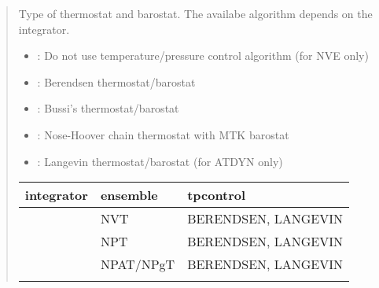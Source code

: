 \documentclass[a4paper,11pt,oneside,english]{sphinxmanual}
\begin{document}
 
\begin{quote}


Type of thermostat and barostat. The availabe algorithm depends on the integrator.
\begin{itemize}
\item {} 
: Do not use temperature/pressure control algorithm (for NVE only)

\item {} 
: Berendsen thermostat/barostat 

\item {} 
: Bussi’s thermostat/barostat  

\item {} 
: Nose-Hoover chain thermostat with MTK barostat  

\item {} 
: Langevin thermostat/barostat  (for ATDYN only)

\end{itemize}


\begin{savenotes}\sphinxattablestart
\centering
\begin{tabulary}{\linewidth}[t]{|T|T|T|}
\hline
\sphinxstyletheadfamily 
integrator
&\sphinxstyletheadfamily 
ensemble
&\sphinxstyletheadfamily 
tpcontrol
\\
\hline{}%
&
NVT
&
BERENDSEN, LANGEVIN
\\
&
NPT
&
BERENDSEN, LANGEVIN
\\
&
NPAT/NPgT
&
BERENDSEN, LANGEVIN
\\
\hline{}
\end{tabulary}
\end{savenotes}
\end{quote}
\end{document}
